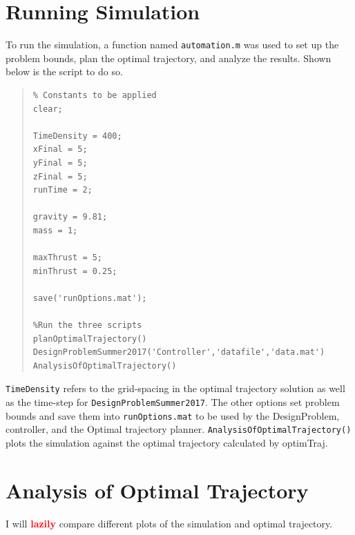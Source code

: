 \documentclass[12pt]{article}
\begin{document}
\section{Running Simulation}\label{Running Simulation}

To run the simulation, a function named \lstinline!automation.m! was used to set up the problem bounds, plan the optimal trajectory, and analyze the results. Shown below is the script to do so.
\begin{quote}
\begin{lstlisting}
% Constants to be applied
clear; 

TimeDensity = 400;
xFinal = 5;
yFinal = 5;
zFinal = 5;
runTime = 2;

gravity = 9.81;
mass = 1;

maxThrust = 5;
minThrust = 0.25;

save('runOptions.mat');

%Run the three scripts
planOptimalTrajectory()
DesignProblemSummer2017('Controller','datafile','data.mat')
AnalysisOfOptimalTrajectory()

\end{lstlisting}
\end{quote}
\lstinline!TimeDensity! refers to the grid-spacing in the optimal trajectory solution as well as the time-step for \lstinline!DesignProblemSummer2017!. The other options set problem bounds and save them into \lstinline!runOptions.mat! to be used by the DesignProblem, controller, and the Optimal trajectory planner. 
\newline
\newline
\lstinline!AnalysisOfOptimalTrajectory()! plots the simulation against the optimal trajectory calculated by optimTraj.
\section{Analysis of Optimal Trajectory}
 
I will \textcolor{red}{\textbf{lazily}} compare different plots of the simulation and optimal trajectory.

\clearpage
\end{document}
